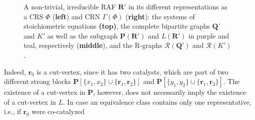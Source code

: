 \documentclass[pdflatex]{sn-jnl}
\theoremstyle{thmstyleone}%
\theoremstyle{examplesty}%
\theoremstyle{thmstylethree}%
\newcommand{\king}{K}
\newcommand{\queen}{\mathbf{Q}}
\newcommand{\princess}{\mathbf{P}}
\newcommand{\lord}{L}
\newcommand{\RGraph}[0]{\mathcal{R}}
\newcommand{\fr}[0]{\mathbf{r}}
\newcommand{\RAF}[0]{\mathbf{R}'}
\begin{document}
\begin{figure}[htb]
  \par\bigskip
  \begin{minipage}[c]{0.49\textwidth}
    \centering
    
  \end{minipage}%
  \hfill%
  \begin{minipage}[c]{0.49\textwidth}
    \centering
    
  \end{minipage}
  \par\bigskip
  
  \caption{A non-trivial, irreducible RAF $\RAF$ in its different
    representations as a CRS $\Phi$ (\textbf{left}) and CRN $\Gamma(\Phi)$
    (\textbf{right}): the systems of stoichiometric equations
    \textbf{(top)}, the complete bipartite graphs $\queen'$ and $\king'$ as
    well as the subgraph $\princess(\RAF)$ and $\lord(\RAF)$ in purple and
    teal, respectively (\textbf{middle}), and the R-graphs
    $\RGraph(\queen')$ and $\RGraph(\king')$.}
  \label{ex:CutVertex}
\end{figure}
Indeed, $\fr_0$ is a cut-vertex, since it has two catalysts, which are part
of two different strong blocks $\princess[\{x_1,x_2\} \cup
  \{\fr_1,\fr_2\}]$ and $\princess[\{y_1,y_2\} \cup \{\fr_1,\fr_3\}]$. The
existence of a cut-vertex in $\princess$, however, does not necessarily
imply the existence of a cut-vertex in $\lord$. In case an equivalence
class contains only one representative, i.e., if $\fr_0$ were co-catalyzed
\end{document}
